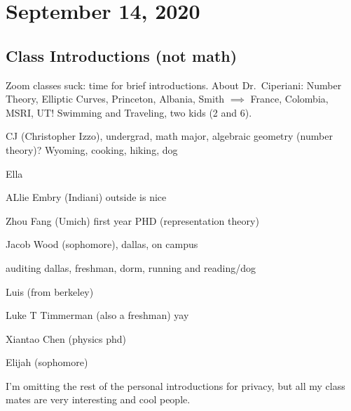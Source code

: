 \section{September 14, 2020}
\subsection{Class Introductions (not math)}

Zoom classes suck: time for brief introductions. About Dr.\ Ciperiani: Number Theory, Elliptic Curves, Princeton, Albania, Smith $\implies $ France, Colombia, MSRI, UT! Swimming and Traveling, two kids (2 and 6).

CJ (Christopher Izzo), undergrad, math major, algebraic geometry (number theory)? Wyoming, cooking, hiking, dog

Ella  

ALlie Embry (Indiani) outside is nice

Zhou Fang (Umich) first year PHD (representation theory)

Jacob Wood (sophomore), dallas, on campus

auditing dallas, freshman, dorm, running and reading/dog

Luis (from berkeley)

Luke T Timmerman (also a freshman) yay

Xiantao Chen (physics phd)

Elijah (sophomore) %

I'm omitting the rest of the personal introductions for privacy, but all my class mates are very interesting and cool people.

